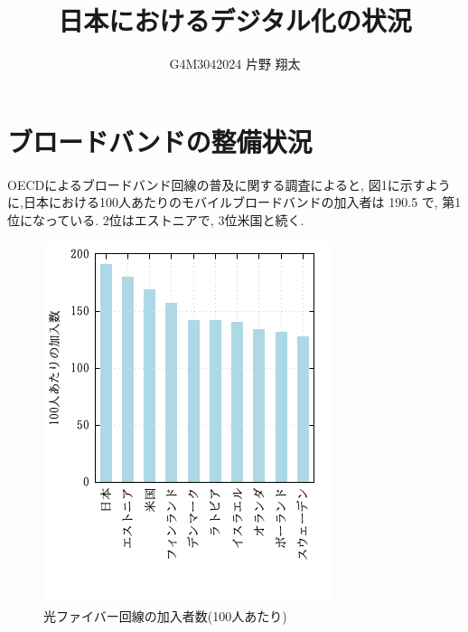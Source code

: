 \documentclass[a4paper,11pt,dvipdfmx]{ujarticle}
\title{日本におけるデジタル化の状況}
\author{G4M3042024 片野 翔太}
\begin{document}
\maketitle %

\section{ブロードバンドの整備状況}
OECDによるブロードバンド回線の普及に関する調査\cite{soumu}によると,
図1に示すように,日本における100人あたりのモバイルブロードバンドの加入者は 
190.5 で, 第1位になっている.
2位はエストニアで, 3位米国と続く.
\begin{figure}[htbp]
 \includegraphics{fig21.png}
 \centering
 \caption{光ファイバー回線の加入者数(100人あたり)}
 \label{}
 \centering
\end{figure}
\end{document}
